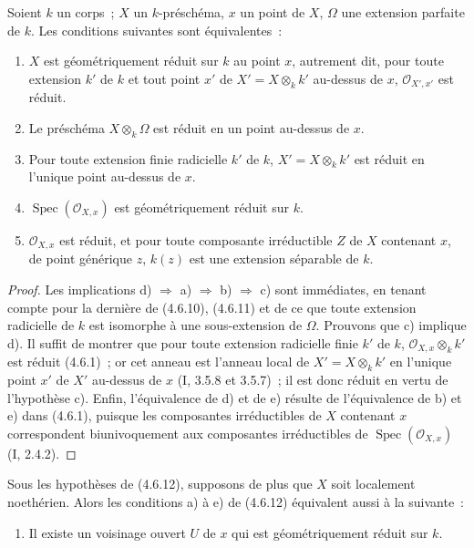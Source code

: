 \begin{proposition}[4.6.12]
\label{IV.2.4.6.12-fr}
Soient $k$ un corps~; $X$ un $k$-préschéma, $x$ un point de $X$, $\Omega$ une
extension parfaite de $k$. Les conditions suivantes sont équivalentes~:
\begin{enumerate}
\item[a)] $X$ est géométriquement réduit sur $k$ au point $x$, autrement dit,
pour toute extension $k'$ de $k$ et tout point $x'$ de
$X'=X\otimes_k k'$ au-dessus de $x$, $\mathcal O_{X',x'}$ est réduit.
\item[b)] Le préschéma $X\otimes_k\Omega$ est réduit en un point au-dessus de
$x$.
\item[c)] Pour toute extension finie radicielle $k'$ de $k$,
$X'=X\otimes_k k'$ est réduit en l'unique point au-dessus de $x$.
\item[d)] $\operatorname{Spec}(\mathcal O_{X,x})$ est géométriquement réduit
sur $k$.
\item[e)] $\mathcal O_{X,x}$ est réduit, et pour toute composante irréductible
$Z$ de $X$ contenant $x$, de point générique $z$, $k(z)$ est une extension
séparable de $k$.
\end{enumerate}
\end{proposition}

\begin{proof}
Les implications d) $\Rightarrow$ a) $\Rightarrow$ b) $\Rightarrow$ c) sont
immédiates, en tenant compte pour la dernière de (4.6.10), (4.6.11) et de ce
que toute extension radicielle de $k$ est isomorphe à une sous-extension de
$\Omega$. Prouvons que c) implique d). Il suffit de montrer que pour toute
extension radicielle finie $k'$ de $k$, $\mathcal O_{X,x}\otimes_k k'$ est
réduit (4.6.1)~; or cet anneau est l'anneau local de $X'=X\otimes_k k'$ en
l'unique point $x'$ de $X'$ au-dessus de $x$ (I, 3.5.8 et 3.5.7)~; il est donc
réduit en vertu de l'hypothèse c). Enfin, l'équivalence de d) et de e)
résulte de l'équivalence de b) et e) dans (4.6.1), puisque les composantes
irréductibles de $X$ contenant $x$ correspondent biunivoquement aux composantes
irréductibles de $\operatorname{Spec}(\mathcal O_{X,x})$ (I, 2.4.2).
\end{proof}

\begin{corollary}[4.6.13]
\label{IV.2.4.6.13-fr}
Sous les hypothèses de (4.6.12), supposons de plus que $X$ soit localement
noethérien. Alors les conditions a) à e) de (4.6.12) équivalent aussi à la
suivante~:
\begin{enumerate}
\item[f)] Il existe un voisinage ouvert $U$ de $x$ qui est géométriquement
réduit sur $k$.
\end{enumerate}
\end{corollary}

